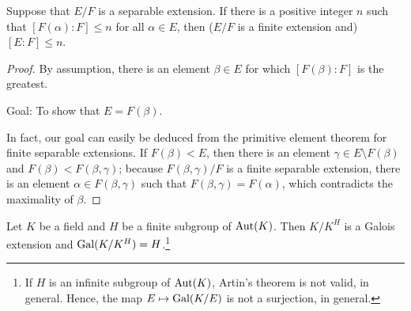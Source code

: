 \begin{prop}
    Suppose that $E/F$ is a separable extension.
    If there is a positive integer $n$ such that $[F(\alpha): F]\leq n$ for all $\alpha\in E$, then ($E/F$ is a finite extension and) $[E:F]\leq n$. 
\end{prop}
\begin{proof}
    By assumption, there is an element $\beta\in E$ for which $[F(\beta): F]$ is the greatest.
    \begin{center}
        Goal: To show that $E=F(\beta)$.
    \end{center}
    In fact, our goal can easily be deduced from the primitive element theorem for finite separable extensions.
    If $F(\beta)<E$, then there is an element $\gamma\in E\setminus F(\beta)$ and $F(\beta)<F(\beta, \gamma)$; because $F(\beta, \gamma)/F$ is a finite separable extension, there is an element $\alpha\in F(\beta, \gamma)$ such that $F(\beta, \gamma)=F(\alpha)$, which contradicts the maximality of $\beta$.
\end{proof}
\begin{lem}
    Let $K$ be a field and $H$ be a finite subgroup of ${\textrm{Aut}({K})}$.
    Then $K/K^H$ is a Galois extension and ${\textrm{Gal}({K/K^H})}=H$.\footnote{If $H$ is an infinite subgroup of ${\textrm{Aut}({K})}$, Artin's theorem is not valid, in general. Hence, the map $E\mapsto{\textrm{Gal}({K/E})}$ is not a surjection, in general.}
\end{lem}
